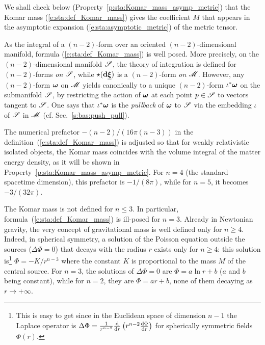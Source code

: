 We shall check below (Property~\ref{p:sta:Komar_mass_asymp_metric}) that
the Komar mass (\ref{e:sta:def_Komar_mass}) gives the coefficient $M$ that
appears in the asymptotic expansion (\ref{e:sta:asymptotic_metric}) of the
metric tensor.

\begin{remark}
\label{r:sta:Komar_well_posed}
As the integral of a $(n-2)$-form over an oriented $(n-2)$-dimensional manifold, formula
(\ref{e:sta:def_Komar_mass}) is well posed. More precisely, on the $(n-2)$-dimensional
manifold $\mathscr{S}$, the theory of integration is defined for $(n-2)$-forms \emph{on} $\mathscr{S}$,
while $\star(\mathbf{d} \underline{\bm{\xi}})$ is a $(n-2)$-form \emph{on} $\mathscr{M}$. However, any
$(n-2)$-form $\bm{\omega}$ on $\mathscr{M}$ yields canonically to a unique $(n-2)$-form
$\iota^* \bm{\omega}$ on the
submanifold $\mathscr{S}$, by restricting the action of $\bm{\omega}$ at each point
$p\in\mathscr{S}$ to vectors tangent to $\mathscr{S}$. One says that $\iota^* \bm{\omega}$ is the
\emph{pullback} of $\bm{\omega}$ to $\mathscr{S}$ via the embedding $\iota$ of $\mathscr{S}$ in $\mathscr{M}$
(cf. Sec.~\ref{s:bas:push_pull}).
\end{remark}

\begin{remark}
The numerical prefactor $- (n-2)/(16\pi(n-3))$ in the definition~(\ref{e:sta:def_Komar_mass})
is adjusted so that for weakly relativistic isolated objects, the Komar mass coincides
with the volume integral of the matter energy density, as it will be shown in
Property~\ref{p:sta:Komar_mass_asymp_metric}.
For $n=4$ (the standard spacetime dimension), this prefactor is $-1/(8\pi)$,
while for $n=5$, it becomes $-3/(32\pi)$.
\end{remark}

\begin{remark}
The Komar mass is not defined for $n \leq 3$. In particular,
formula~(\ref{e:sta:def_Komar_mass}) is ill-posed for $n=3$.
Already in Newtonian gravity, the very concept of gravitational mass is well defined only
for $n \geq 4$. Indeed, in spherical symmetry,
a solution of the Poisson equation outside the sources ($\Delta \Phi = 0$)
that decays with the radius $r$ exists only for $n \geq 4$: this solution is\footnote{This is easy
to get since in the Euclidean space of dimension $n-1$ the Laplace
operator is $\Delta\Phi = \frac{1}{r^{n-2}} \frac{\mathrm{d} }{\mathrm{d} r} \left( r^{n-2} \frac{\mathrm{d} \Phi}{\mathrm{d} r} \right)$
for spherically symmetric fields $\Phi(r)$.}
$\Phi = - K/r^{n-3}$ where the constant $K$ is proportional to the mass $M$ of the central source.
For $n=3$, the solutions of $\Delta \Phi = 0$ are $\Phi = a \ln r + b$ ($a$ and $b$ being constant), while
for $n=2$, they are $\Phi = a r + b$, none of them decaying as $r\to +\infty$.
\end{remark}

